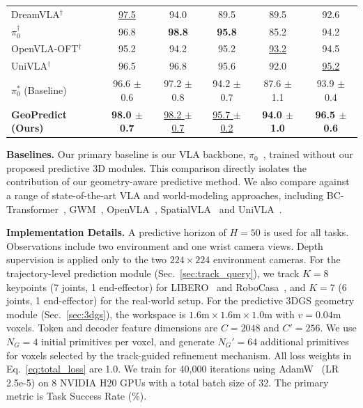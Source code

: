 \begin{table}[htbp]
\begin{tabular}{l | c  c  c  c | c}
DreamVLA$^{\bm{\dagger}}$~\cite{zhangdreamvla} & \underline{97.5} & 94.0 & 89.5 & 89.5 & 92.6 \\
$\pi_0^{\bm{\dagger}}$~\cite{black2410pi0} & 96.8 & \textbf{98.8} & \textbf{95.8} & 85.2 & 94.2\\
OpenVLA-OFT$^{\bm{\dagger}}$~\cite{kim2025fine} & 95.2 & 94.2 & 95.2 & \underline{93.2} & 94.5 \\
UniVLA$^{\bm{\dagger}}$~\cite{bu2025univla} & 96.5 & 96.8 & 95.6 & 92.0 & \underline{95.2} \\
\midrule
$\pi_0^{\bm{\ast}}$ (Baseline)~\cite{black2410pi0} & 96.6 $\pm$ 0.6 & 97.2 $\pm$ 0.8 & 94.2 $\pm$ 0.7 & 87.6 $\pm$ 1.1 & 93.9 $\pm$ 0.4\\
\textbf{GeoPredict (Ours)} & \textbf{98.0 $\pm$ 0.7} & \underline{98.2 $\pm$ 0.7} & \underline{95.7 $\pm$ 0.2} & \textbf{94.0 $\pm$ 1.0} & \textbf{96.5 $\pm$ 0.6} \\
\bottomrule
\end{tabular}
\label{tab:libero}
\vspace{-10pt}
\end{table}

\noindent \textbf{Baselines.}
Our primary baseline is our VLA backbone, \textbf{$\pi_0$}~\cite{black2410pi0}, trained without our proposed predictive 3D modules. This comparison directly isolates the contribution of our geometry-aware predictive method. We also compare against a range of state-of-the-art VLA and world-modeling approaches, including BC-Transformer~\cite{nasiriany2024robocasa}, GWM~\cite{lu2025gwm}, OpenVLA~\cite{kim2025openvla}, SpatialVLA~\cite{qu2025spatialvla} and UniVLA~\cite{bu2025univla}.


\noindent \textbf{Implementation Details.}
A predictive horizon of $H=50$ is used for all tasks. Observations include two environment and one wrist camera views. Depth supervision is applied only to the two $224\times224$ environment cameras. For the trajectory-level prediction module (Sec.~\ref{sec:track_query}), we track $K=8$ keypoints (7 joints, 1 end-effector) for LIBERO~\cite{liu2023libero} and RoboCasa~\cite{nasiriany2024robocasa}, and $K=7$ (6 joints, 1 end-effector) for the real-world setup. For the predictive 3DGS geometry module (Sec.~\ref{sec:3dgs}), the workspace is $1.6\text{m} \times 1.6\text{m} \times 1.0\text{m}$ with $v=0.04$m voxels. Token and decoder feature dimensions are $C=2048$ and $C'=256$. We use $N_G=4$ initial primitives per voxel, and generate $N_G'=64$ additional primitives for voxels selected by the track-guided refinement mechanism. All loss weights in Eq.~\eqref{eq:total_loss} are 1.0. We train for 40,000 iterations using AdamW~\cite{loshchilovdecoupled} (LR 2.5e-5) on 8 NVIDIA H20 GPUs with a total batch size of 32. The primary metric is Task Success Rate (\%).











